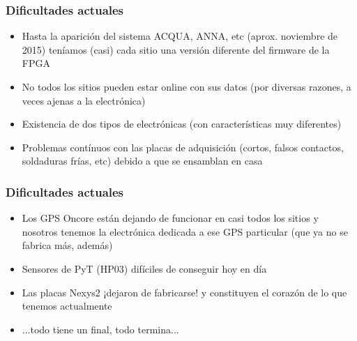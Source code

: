 \documentclass{beamer}
\begin{document}
\begin{frame}
	\frametitle{Dificultades actuales}
	\begin{alertblock}{}
		\begin{itemize}
		\item Hasta la aparición del sistema \alert{ACQUA}, \alert{ANNA}, etc
					(aprox. noviembre de 2015) teníamos (casi) cada sitio una versión
					diferente del \alert{firmware} de la FPGA 
		\item No todos los sitios pueden estar online con sus datos (por diversas
					razones, a veces ajenas a la electrónica)
		\item Existencia de dos tipos de electrónicas (con características muy
					diferentes)
		\item Problemas contínuos con las placas de adquisición (cortos, falsos
					contactos, soldaduras frías, etc) debido a que se ensamblan en casa
		\end{itemize}
	\end{alertblock}
\end{frame} 

\begin{frame}
	\frametitle{Dificultades actuales}
	\begin{alertblock}{}
		\begin{itemize}
		\item Los GPS Oncore están dejando de funcionar en casi todos los sitios y
					nosotros tenemos la electrónica dedicada a ese GPS particular (que ya no se
					fabrica más, además)
		\item Sensores de PyT (HP03) difíciles de conseguir hoy en día
		\item Las placas Nexys2 \alert{¡dejaron de fabricarse!} y constituyen el
					corazón de lo que tenemos actualmente
		\item ...todo tiene un final, todo termina...
		\end{itemize}
	\end{alertblock}
\end{frame} 
\end{document}
